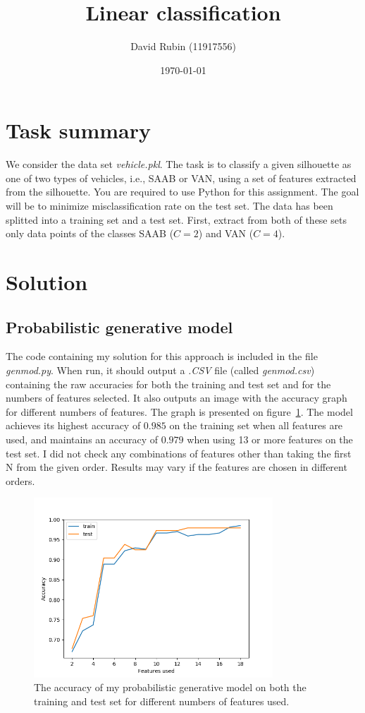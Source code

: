 \documentclass[a4paper,11pt]{article}
\title{Linear classification}
\author{David Rubin (11917556)}
\date{\today}
\begin{document}
\maketitle

\section{Task summary}

We consider the data set \textit{vehicle.pkl}. The task is to classify a given silhouette as
one of two types of vehicles, i.e., SAAB or VAN, using a set of features extracted from
the silhouette. You are required to use Python for this assignment. The goal will be to
minimize misclassification rate on the test set. The data has been splitted into a training
set and a test set. First, extract from both of these sets only data points of the classes
SAAB ($C = 2$) and VAN ($C = 4$).

\section{Solution}

\subsection{Probabilistic generative model}

The code containing my solution for this approach is included in the file \textit{genmod.py}. When run, it should output a \textit{.CSV} file (called \textit{genmod.csv}) containing the raw accuracies for both the training and test set and for the numbers of features selected. It also outputs an image with the accuracy graph for different numbers of features. The graph is presented on figure~\ref{genmod:acc}. The model achieves its highest accuracy of $0.985$ on the training set when all features are used, and maintains an accuracy of $0.979$ when using 13 or more features on the test set. I did not check any combinations of features other than taking the first N from the given order. Results may vary if the features are chosen in different orders.

\begin{figure}
\centering
\includegraphics[width=0.8\textwidth]{images/genmod_acc.png}
\caption{The accuracy of my probabilistic generative model on both the training and test set for different numbers of features used.}
\label{genmod:acc}
\end{figure} 
\end{document}
